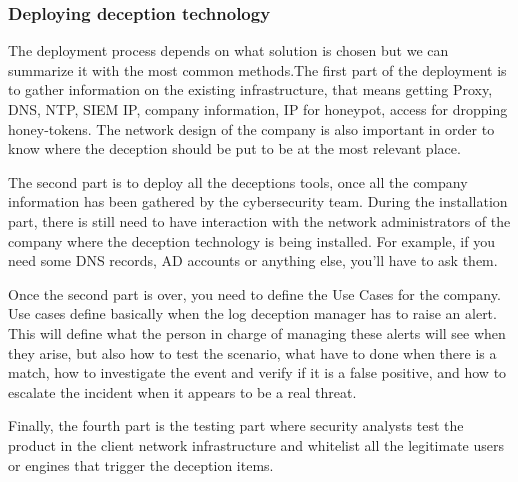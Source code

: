 \documentclass{tnreport}
\begin{document}
\subsubsection{Deploying deception technology}
The deployment process depends on what solution is chosen but we can summarize it with the most common methods.\eol The first part of the deployment is to gather information on the existing infrastructure, that means getting Proxy, \gls{DNS}, \gls{NTP}, \gls{SIEM} IP, company information, IP for honeypot, access for dropping honey-tokens. The network design of the company is also important in order to know where the deception should be put to be at the most relevant place.

The second part is to deploy all the deceptions tools, once all the company information has been gathered by the cybersecurity team. During the installation part, there is still need to have interaction with the network administrators of the company where the deception technology is being installed. For example, if you need some DNS records, AD accounts or anything else, you'll have to ask them.

Once the second part is over, you need to define the Use Cases for the company. Use cases define basically when the log deception manager has to raise an alert. This will define what the person in charge of managing these alerts will see when they arise, but also how to test the scenario, what have to done when there is a match, how to investigate the event and verify if it is a false positive, and how to escalate the incident when it appears to be a real threat.

Finally, the fourth part is the testing part where security analysts test the product in the client network infrastructure and whitelist all the legitimate users or engines that trigger the deception items.
\end{document}
